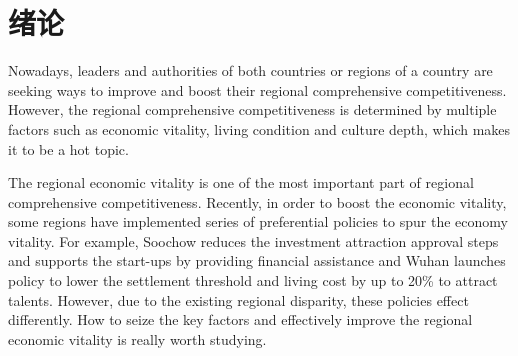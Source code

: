 \documentclass{apmcmthesis}
\begin{document}
\pagestyle{frontmatterstyle}

\begin{abstract}

\end{abstract}



\newpage
\tableofcontents


\newpage
\pagestyle{mainmatterstyle}
\setcounter{page}{1}
\section{绪论}

\hspace{2em}Nowadays, leaders and authorities of both countries or regions of a country are seeking ways to improve and boost their regional comprehensive competitiveness. However, the regional comprehensive competitiveness is determined by multiple factors such as economic vitality, living condition and culture depth, which makes it to be a hot topic.

The regional economic vitality is one of the most important part of regional comprehensive competitiveness. Recently, in order to boost the economic vitality, some regions have implemented series of preferential policies to spur the economy vitality. For example, Soochow reduces the investment attraction approval steps and supports the start-ups by providing financial assistance and Wuhan launches policy to lower
the settlement threshold and living cost by up to 20\%  to attract talents. However, due to the existing regional disparity, these policies effect differently. How to seize the key factors and effectively improve the regional economic vitality is really worth studying.
\end{document}
